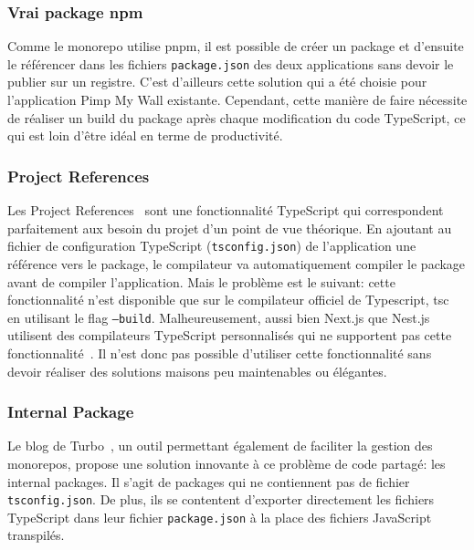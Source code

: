 \subsubsection{Vrai package npm}

Comme le monorepo utilise \gls{pnpm}, il est possible de créer un package et d'ensuite le référencer dans les fichiers \texttt{package.json} des deux applications sans devoir le publier sur un registre. C'est d'ailleurs cette solution qui a été choisie pour l'application Pimp My Wall existante. Cependant, cette manière de faire nécessite de réaliser un build du package après chaque modification du code TypeScript, ce qui est loin d'être idéal en terme de productivité.

\subsubsection{Project References}

Les Project References~\cite{project-references} sont une fonctionnalité TypeScript qui correspondent parfaitement aux besoin du projet d'un point de vue théorique. En ajoutant au fichier de configuration TypeScript (\texttt{tsconfig.json}) de l'application une référence vers le package, le compilateur va automatiquement compiler le package avant de compiler l'application. Mais le problème est le suivant: cette fonctionnalité n'est disponible que sur le compilateur officiel de Typescript, tsc~\cite{tsc} en utilisant le flag \texttt{--build}. Malheureusement, aussi bien Next.js que Nest.js utilisent des compilateurs TypeScript personnalisés qui ne supportent pas cette fonctionnalité~\cite{nest-tsc-build-option}. Il n'est donc pas possible d'utiliser cette fonctionnalité sans devoir réaliser des solutions maisons peu maintenables ou élégantes.

\subsubsection{Internal Package}

Le blog de Turbo~\cite{you-might-not-need-typescript-project-references}, un outil permettant également de faciliter la gestion des monorepos, propose une solution innovante à ce problème de code partagé: les internal packages. Il s'agit de packages qui ne contiennent pas de fichier \texttt{tsconfig.json}. De plus, ils se contentent d'exporter directement les fichiers TypeScript dans leur fichier \texttt{package.json} à la place des fichiers JavaScript transpilés.


